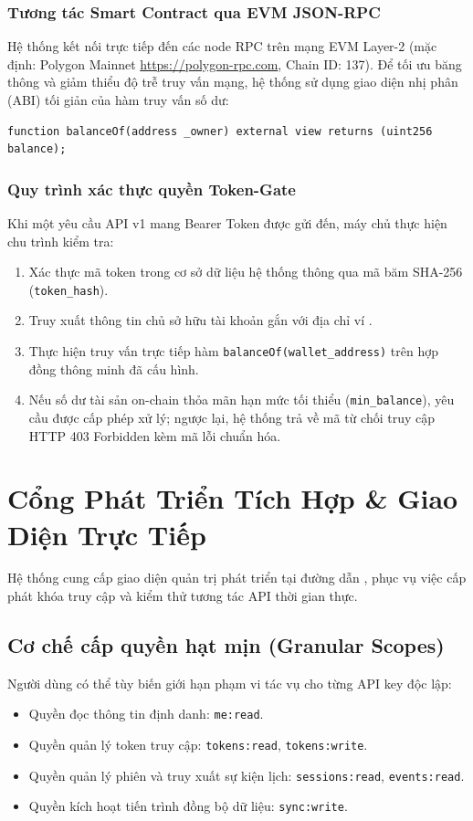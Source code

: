 \documentclass[11pt,a4paper]{article}
\begin{document}
\subsubsection{Tương tác Smart Contract qua EVM JSON-RPC}
Hệ thống kết nối trực tiếp đến các node RPC trên mạng EVM Layer-2 (mặc định: Polygon Mainnet \url{https://polygon-rpc.com}, Chain ID: 137). Để tối ưu băng thông và giảm thiểu độ trễ truy vấn mạng, hệ thống sử dụng giao diện nhị phân (ABI) tối giản của hàm truy vấn số dư:
\begin{lstlisting}[language=solidity]
function balanceOf(address _owner) external view returns (uint256 balance);
\end{lstlisting}

\subsubsection{Quy trình xác thực quyền Token-Gate}
Khi một yêu cầu API v1 mang Bearer Token được gửi đến, máy chủ thực hiện chu trình kiểm tra:
\begin{enumerate}
    \item Xác thực mã token trong cơ sở dữ liệu hệ thống thông qua mã băm SHA-256 (\texttt{token\_hash}).
    \item Truy xuất thông tin chủ sở hữu tài khoản gắn với địa chỉ ví .
    \item Thực hiện truy vấn trực tiếp hàm \texttt{balanceOf(wallet\_address)} trên hợp đồng thông minh đã cấu hình.
    \item Nếu số dư tài sản on-chain thỏa mãn hạn mức tối thiểu (\texttt{min\_balance}), yêu cầu được cấp phép xử lý; ngược lại, hệ thống trả về mã từ chối truy cập HTTP 403 Forbidden kèm mã lỗi chuẩn hóa.
\end{enumerate}

\section{Cổng Phát Triển Tích Hợp \& Giao Diện Trực Tiếp}

Hệ thống cung cấp giao diện quản trị phát triển tại đường dẫn , phục vụ việc cấp phát khóa truy cập và kiểm thử tương tác API thời gian thực.

\subsection{Cơ chế cấp quyền hạt mịn (Granular Scopes)}
Người dùng có thể tùy biến giới hạn phạm vi tác vụ cho từng API key độc lập:
\begin{itemize}
    \item Quyền đọc thông tin định danh: \texttt{me:read}.
    \item Quyền quản lý token truy cập: \texttt{tokens:read}, \texttt{tokens:write}.
    \item Quyền quản lý phiên và truy xuất sự kiện lịch: \texttt{sessions:read}, \texttt{events:read}.
    \item Quyền kích hoạt tiến trình đồng bộ dữ liệu: \texttt{sync:write}.
\end{itemize}
\end{document}
